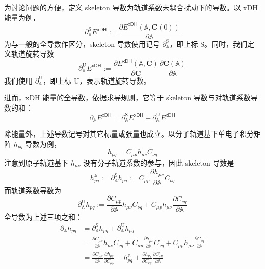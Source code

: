 为讨论问题的方便，定义 skeleton 导数为轨道系数未耦合扰动下的导数。以 xDH 能量为例，
\begin{equation}
  \partial_{\mathbb{A}}^\mathrm{S} E^\textsf{xDH} := \frac{\partial E^\textsf{xDH} (\mathbb{A}, \mathbf{C} (0))}{\partial \mathbb{A}}
\end{equation}
为与一般的全导数作区分，skeleton 导数使用记号 $\partial_{\mathbb{A}}^\mathrm{S}$，即上标 $\mathrm{S}$。同时，我们定义轨道旋转导数
\begin{equation}
  \partial_{\mathbb{A}}^\mathrm{U} E^\textsf{xDH} := \frac{\partial E^\textsf{xDH} (\mathbb{A}, \mathbf{C})}{\partial \mathbf{C}} \frac{\partial \mathbf{C} (\mathbb{A})}{\partial \mathbb{A}}
\end{equation}
我们使用 $\partial_{\mathbb{A}}^\mathrm{U}$，即上标 $\mathrm{U}$，表示轨道旋转导数。

进而，xDH 能量的全导数，依据求导规则，它等于 skeleton 导数与对轨道系数导数的和：
\begin{equation}
  \partial_{\mathbb{A}} E^\textsf{xDH} = \partial_{\mathbb{A}}^\mathrm{S} E^\textsf{xDH} + \partial_{\mathbb{A}}^\mathrm{U} E^\textsf{xDH}
\end{equation}

除能量外，上述导数记号对其它标量或张量也成立。以分子轨道基下单电子积分矩阵 $h_{pq}$ 导数为例，
\begin{equation*}
  h_{pq} = C_{\mu p} h_{\mu \nu} C_{\nu q}
\end{equation*}
注意到原子轨道基下 $h_{\mu \nu}$ 没有分子轨道系数的参与，因此 skeleton 导数是
\begin{equation*}
  h_{pq}^{\mathbb{A}} := \partial_{\mathbb{A}}^\mathrm{S} h_{pq} := C_{\mu p} \frac{\partial h_{\mu \nu}}{\partial \mathbb{A}} C_{\nu q}
\end{equation*}
而轨道系数导数为
\begin{equation*}
  \partial_{\mathbb{A}}^\mathrm{U} h_{pq} := \frac{\partial C_{\mu p}}{\partial \mathbb{A}} h_{\mu \nu} C_{\nu q} + C_{\mu p} h_{\mu \nu} \frac{\partial C_{\nu q}}{\partial \mathbb{A}}
\end{equation*}
全导数为上述三项之和：
\begin{align*}
  \partial_{\mathbb{A}} h_{pq} &= \partial_{\mathbb{A}}^\mathrm{S} h_{pq} + \partial_{\mathbb{A}}^\mathrm{U} h_{pq} \\
  &= \frac{\partial C_{\mu p}}{\partial \mathbb{A}} h_{\mu \nu} C_{\nu q} + C_{\mu p} \frac{\partial h_{\mu \nu}}{\partial \mathbb{A}} C_{\nu q} + C_{\mu p} h_{\mu \nu} \frac{\partial C_{\nu q}}{\partial \mathbb{A}} \\
  &= \frac{\partial C_{\mu p}}{\partial \mathbb{A}} \frac{\partial h_{pq}}{\partial C_{\mu p}} + h_{pq}^{\mathbb{A}} + \frac{\partial h_{pq}}{\partial C_{\nu q}} \frac{\partial C_{\nu q}}{\partial \mathbb{A}}
\end{align*}


